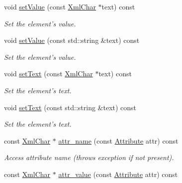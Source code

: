 \begin{DoxyCompactItemize}
void \hyperlink{class_d_d4hep_1_1_x_m_l_1_1_handle__t_aa04db3e02912d490c9eeef20df7c57b8}{setValue} (const \hyperlink{namespace_d_d4hep_1_1_x_m_l_a09e5d9cc86ed782f6826dfe0778c1815}{XmlChar} $\ast$text) const 
\begin{DoxyCompactList}\small\item\em Set the element's value. \item\end{DoxyCompactList}\item 
void \hyperlink{class_d_d4hep_1_1_x_m_l_1_1_handle__t_adbb7796780b972513d5b75df704807c0}{setValue} (const std::string \&text) const 
\begin{DoxyCompactList}\small\item\em Set the element's value. \item\end{DoxyCompactList}\item 
void \hyperlink{class_d_d4hep_1_1_x_m_l_1_1_handle__t_a51f2f7fef3796fe3a1eab5a69c9d0c48}{setText} (const \hyperlink{namespace_d_d4hep_1_1_x_m_l_a09e5d9cc86ed782f6826dfe0778c1815}{XmlChar} $\ast$text) const 
\begin{DoxyCompactList}\small\item\em Set the element's text. \item\end{DoxyCompactList}\item 
void \hyperlink{class_d_d4hep_1_1_x_m_l_1_1_handle__t_ad797ed301255dd7547f804ae2344f39d}{setText} (const std::string \&text) const 
\begin{DoxyCompactList}\small\item\em Set the element's text. \item\end{DoxyCompactList}\item 
const \hyperlink{namespace_d_d4hep_1_1_x_m_l_a09e5d9cc86ed782f6826dfe0778c1815}{XmlChar} $\ast$ \hyperlink{class_d_d4hep_1_1_x_m_l_1_1_handle__t_aacd63b52439de83725269fc810d1f531}{attr\_\-name} (const \hyperlink{namespace_d_d4hep_1_1_x_m_l_a5c19b7116be99d69b4b22d911357baaf}{Attribute} attr) const 
\begin{DoxyCompactList}\small\item\em Access attribute name (throws exception if not present). \item\end{DoxyCompactList}\item 
const \hyperlink{namespace_d_d4hep_1_1_x_m_l_a09e5d9cc86ed782f6826dfe0778c1815}{XmlChar} $\ast$ \hyperlink{class_d_d4hep_1_1_x_m_l_1_1_handle__t_a6a361bb14e86de168935c9614a261a12}{attr\_\-value} (const \hyperlink{namespace_d_d4hep_1_1_x_m_l_a5c19b7116be99d69b4b22d911357baaf}{Attribute} attr) const 

\end{DoxyCompactItemize}
